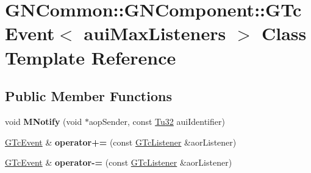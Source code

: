\hypertarget{class_g_n_common_1_1_g_n_component_1_1_g_tc_event}{}\section{G\+N\+Common\+:\+:G\+N\+Component\+:\+:G\+Tc\+Event$<$ aui\+Max\+Listeners $>$ Class Template Reference}
\label{class_g_n_common_1_1_g_n_component_1_1_g_tc_event}
\subsection*{Public Member Functions}
\begin{DoxyCompactItemize}
\item 
\mbox{\label{class_g_n_common_1_1_g_n_component_1_1_g_tc_event_a97e465b1537a3a906f2e1040f60ea880}} 
void {\bfseries M\+Notify} (void $\ast$aop\+Sender, const \mbox{\hyperlink{namespace_g_n_common_a941b527ef318f318aed7903dc832b7e4}{Tu32}} aui\+Identifier)
\item 
\mbox{\label{class_g_n_common_1_1_g_n_component_1_1_g_tc_event_adb06bbd1286161d6fda279e96197e961}} 
\mbox{\hyperlink{class_g_n_common_1_1_g_n_component_1_1_g_tc_event}{G\+Tc\+Event}} \& {\bfseries operator+=} (const \mbox{\hyperlink{class_g_n_common_1_1_g_n_component_1_1_g_tc_listener}{G\+Tc\+Listener}} \&aor\+Listener)
\item 
\mbox{\label{class_g_n_common_1_1_g_n_component_1_1_g_tc_event_a901c402621b19c65c16696c6ba5e0a48}} 
\mbox{\hyperlink{class_g_n_common_1_1_g_n_component_1_1_g_tc_event}{G\+Tc\+Event}} \& {\bfseries operator-\/=} (const \mbox{\hyperlink{class_g_n_common_1_1_g_n_component_1_1_g_tc_listener}{G\+Tc\+Listener}} \&aor\+Listener)
\end{DoxyCompactItemize}
